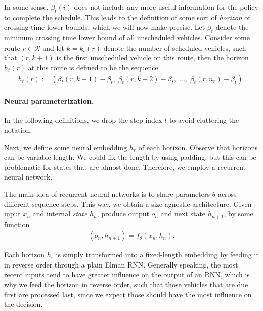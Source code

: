 \documentclass[a4paper]{report}
\theoremstyle{definition}
\theoremstyle{plain}
\newcommand\note[1]{{\color{Navy}#1}}
\begin{document}
In some sense, $\beta_t(i)$ does not include any more useful information for the
policy to complete the schedule.
%
This leads to the definition of some sort of \emph{horizon} of crossing time
lower bounds, which we will now make precise.
%
Let $\bar{\beta}_t$ denote the minimum crossing time lower bound of all
unscheduled vehicles.
%
Consider some route $r \in \mathcal{R}$ and let $k = k_t(r)$ denote the number
of scheduled vehicles, such that $(r, k+1)$ is the first unscheduled vehicle on
this route, then the horizon $h_t(r)$ at this route is defined to be the
sequence
\begin{align}
  h_t(r) := (\beta_t(r, k + 1) - \bar{\beta}_t, \; \beta_t(r, k + 2) - \bar{\beta}_t, \; \dots , \; \beta_t(r, n_r) - \bar{\beta}_t) .
\end{align}

\paragraph{Neural parameterization.}

\note{In the following definitions, we drop the step index $t$ to avoid
cluttering the notation.}

Next, we define some neural embedding $\bar{h}_{r}$ of each horizon. Observe
that horizons can be variable length. We could fix the length by using padding,
but this can be problematic for states that are almost done. Therefore, we
employ a recurrent neural network.

The main idea of recurrent neural networks is to share parameters $\theta$
across different sequence steps.
This way, we obtain a size-agnostic architecture.
%
Given input $x_n$ and internal \emph{state} $h_n$, produce output $o_n$ and next
state $h_{n+1}$, by some function
\begin{align}
  (o_{n}, h_{n+1}) = f_\theta(x_n, h_n) .
\end{align}

Each horizon $h_r$ is simply transformed into
a fixed-length embedding by feeding it in reverse order through a plain Elman
RNN. Generally speaking, the most recent inputs tend to have greater influence
on the output of an RNN, which is why we feed the horizon in reverse order, such
that those vehicles that are due first are processed last, since we expect those
should have the most influence on the decision.
\end{document}
